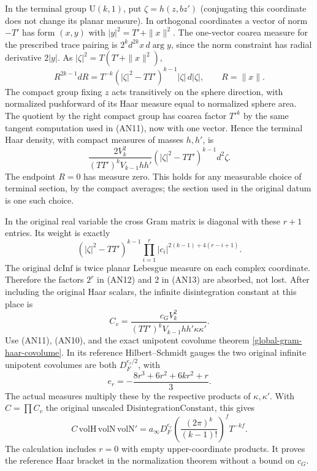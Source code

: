 In the terminal group \(\mathrm U(k,1)\), put
\(\zeta=h(z,bz')\) (conjugating this coordinate does not
change its planar measure). In orthogonal coordinates a
vector of norm \(-T'\) has form \((x,y)\) with
\(|y|^2=T'+\|x\|^2\). The one-vector coarea measure for
the prescribed trace pairing is \(2^k d^{2k}x\,d\arg y\),
since the norm constraint has radial derivative \(2|y|\).
As \(|\zeta|^2=T(T'+\|x\|^2)\),
\[
 R^{2k-1}dR
   =T^{-k}(|\zeta|^2-TT')^{k-1}|\zeta|\,d|\zeta|,
        \qquad R=\|x\|.
\]
The compact group fixing \(z\) acts transitively on the
sphere direction, with normalized pushforward of its Haar
measure equal to normalized sphere area. The quotient by
the right compact group has coarea factor \(T'^k\)
by the same tangent computation used in (AN11), now with
one vector. Hence the terminal Haar density, with compact
measures of masses \(h,h'\), is
\[
 \frac{2 V_k^2}{(TT')^k V_{k-1}hh'}
       (|\zeta|^2-TT')^{k-1}d^2\zeta.                  \tag{AN13}
\]
The endpoint \(R=0\) has measure zero. This holds for any
measurable choice of terminal section, by the compact
averages; the section used in the original datum is one
such choice.

In the original real variable the cross Gram matrix is
diagonal with these \(r+1\) entries. Its weight is exactly
\[
     (|\zeta|^2-TT')^{k-1}
               \prod_{i=1}^r |c_i|^{2(k-1)+4(r-i+1)} .
\]
The original \(\mathrm{dcInf}\) is twice planar Lebesgue
measure on each complex coordinate. Therefore the factors
\(2^r\) in (AN12) and 2 in (AN13) are absorbed, not lost.
After including the original Haar scalars, the infinite
disintegration constant at this place is
\[
         C_v=\frac{c_G V_k^2}
               {(TT')^k V_{k-1}hh'\kappa\kappa'} .
\]
Use (AN11), (AN10), and the exact unipotent covolume theorem
\ref{global-gram-haar-covolume}. In its reference
Hilbert--Schmidt gauges the two original infinite unipotent
covolumes are both \(D_F^{e_r/2}\), with
\[
              e_r=-\frac{8r^3+6r^2+6kr^2+r}{3}.
\]
The actual measures multiply these by the respective products
of \(\kappa,\kappa'\). With \(C=\prod C_v\) the original
unscaled \(\mathrm{DisintegrationConstant}\), this gives
\[
 C\,\mathrm{volH}\,\mathrm{volN}\,\mathrm{volN}'
    =a_\infty D_F^{e_r}
          \left(\frac{(2\pi)^k}{(k-1)!}\right)^f T^{-kf}.
                                                               \tag{AN14}
\]
The calculation includes \(r=0\) with empty upper-coordinate
products. It proves the reference Haar bracket in the
normalization theorem without a bound on \(c_G\).

